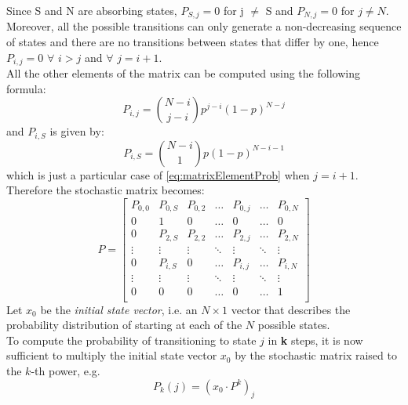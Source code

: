 Since S and N are absorbing states, $P_{S,j}=0$ for j $\neq$ S and $P_{N,j} = 0$
for $j \neq N$.\\
Moreover, all the possible transitions can only generate a non-decreasing
sequence of states and there are no transitions between states that differ by
one, hence\\
$P_{i, j} = 0$ $\forall$ $i > j$ and $\forall$ $j = i + 1$.\\
All the other elements of the matrix can be computed using the following formula:
\begin{equation}
    P_{i,j} = {N-i\choose j - i} p^{j - i} (1-p)^{N - j}
    \label{eq:matrixElementProb}
\end{equation}
and $P_{i,S}$ is given by:
\begin{equation}
    P_{i,S} = {N-i\choose 1} p(1-p)^{N - i - 1}
    \label{eq:matrixProbToS}
\end{equation}
which is just a particular case of \eqref{eq:matrixElementProb} when $j = i + 1$.\\
Therefore the stochastic matrix becomes:
\begin{equation*}
P = 
\begin{bmatrix}
P_{0,0}	& P_{0,S}	& P_{0,2}	& \dots  	& P_{0,j}	& \dots		& P_{0,N} \\
0		& 1			& 0			& \dots  	& 0			& \dots		& 0		 \\
0		& P_{2,S}	& P_{2,2}	& \dots  	& P_{2,j}	& \dots		& P_{2,N} \\
\vdots	& \vdots	& \vdots	& \ddots 	& \vdots	& \ddots	& \vdots \\
0		& P_{i,S}	& 0			& \dots		& P_{i,j}	& \dots		& P_{i,N} \\
\vdots	& \vdots	& \vdots	& \ddots	& \vdots	& \ddots	& \vdots \\
0		& 0			& 0			& \dots  	& 0			& \dots		& 1		 \\
\end{bmatrix}
\label{stochasticMatrix2}
\end{equation*}
Let $x_{0}$ be the \textit{initial state vector}, i.e. an $N \times 1$ vector
that describes the probability distribution of starting at each of the $N$
possible states.\\
To compute the probability of transitioning to state $j$ in \textbf{k} steps, it
is now sufficient to multiply the initial state vector $x_{0}$ by the stochastic
matrix raised to the $k$-th power, e.g.
\begin{equation}\label{probAtStateK1}
P_{k}(j) = (x_{0}\cdot P^{k})_{j}
\end{equation}
